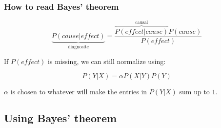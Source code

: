 \begin{frame}\frametitle{How to read Bayes' theorem}


\pause 


\pause

\begin{equation}
\underbrace{P(\mathit{cause}|\mathit{effect})}_{\text{diagnositc}} = \frac{\overbrace{P(\mathit{effect}|\mathit{cause})}^{\text{causal}}P(\mathit{cause})}{P(\mathit{effect})}
\end{equation}

If $P(\mathit{effect})$ is missing, we can still normalize using:

\begin{equation}
P(Y|X) = \alpha P(X|Y)P(Y)
\end{equation}

$\alpha$ is chosen to whatever will make the entries in $P(Y|X)$ sum up to $1$.


\end{frame}

\subsection{Using Bayes' theorem}

